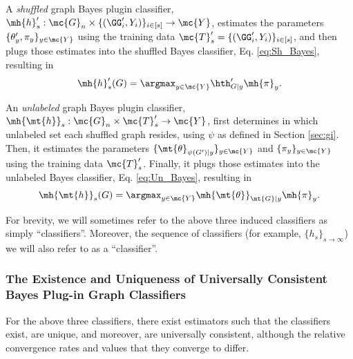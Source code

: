 \documentclass[10pt,journal,cspaper,compsoc]{IEEEtran}
\begin{document}
A \emph{shuffled} graph Bayes plugin classifier,
$\mh{h}_s': \mc{G}_n \times \{(\GG_i',Y_i)\}_{i \in [s]} \to \mc{Y}$,
estimates the parameters $\{\theta_y',\pi_y\}_{y \in \mc{Y}}$ using the training data $\mc{T}_s'=\{(\GG_i',Y_i)\}_{i \in [s]}$, and then plugs those estimates into the shuffled Bayes classifier, Eq. \eqref{eq:Sh_Bayes}, resulting in
\begin{align} \label{eq:Sh_Plug}
	\mh{h}_s'(G)=\argmax_{y\in\mc{Y}} \hth_{G|y}'\mh{\pi}_y.
\end{align}

An \emph{unlabeled} graph Bayes plugin classifier,
$\mh{\mt{h}}_s: \mc{G}_n \times \mc{T}_s' \to \mc{Y}$,
first determines in which unlabeled set each shuffled graph resides, using $\psi$ as defined in Section \ref{sec:gi}.  Then, it estimates the parameters $\{\mt{\theta}_{\psi(G')|y}\}_{y \in \mc{Y}}$ and $\{\pi_y\}_{y \in \mc{Y}}$ using the training data $\mc{T}_s'$. Finally, it plugs those estimates into the unlabeled Bayes classifier, Eq. \eqref{eq:Un_Bayes}, resulting in
\begin{align} \label{eq:Sh_Plug}
	\mh{\mt{h}}_s(G)=\argmax_{y\in\mc{Y}} \mh{\mt{\theta}}_{\mt{G}|y}\mh{\pi}_y.
\end{align}


For brevity, we will sometimes refer to the above three induced classifiers as simply ``classifiers''.  Moreover, the sequence of classifiers (for example, $\{h_s\}_{s \to \infty}$) we will also refer to as a ``classifier''. 

\subsubsection{The Existence and Uniqueness of Universally Consistent Bayes Plug-in Graph Classifiers} %
\label{sub:bayes_plug_in_classifiers_are_consistent}



For the above three classifiers, there exist estimators such that the classifiers exist, are unique, and moreover, are universally consistent, although the relative convergence rates and values that they converge to differ.
\end{document}
